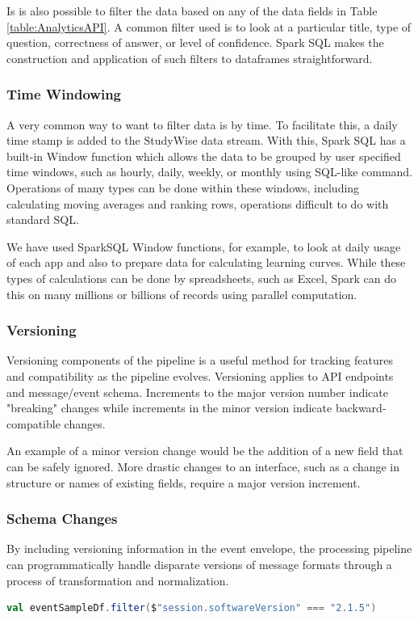 \documentclass[runningheads,a4paper]{llncs}
\begin{document}
Is is also possible to filter the data based on any of the data fields in Table \ref{table:AnalyticsAPI}.  A common filter used is to look at a particular title, type of question, correctness of answer, or level of confidence.  Spark SQL makes the construction and application of such filters to dataframes straightforward.
 
\subsubsection{Time Windowing}

A very common way to want to filter data is by time.  To facilitate this, a daily time stamp is added to the StudyWise data stream.  With this, Spark SQL has a built-in Window function which allows the data to be grouped by user specified time windows, such as hourly, daily, weekly, or monthly using SQL-like command.  Operations of many types can be done within these windows, including calculating moving averages and ranking rows, operations difficult to do with standard SQL.  

We have used SparkSQL Window functions, for example, to look at daily usage of each app and also to prepare data for calculating learning curves.  While these types of calculations can be done by spreadsheets, such as Excel, Spark can do this on many millions or billions of records using parallel computation.

\subsubsection{Versioning}
Versioning components of the pipeline is a useful method for tracking features and compatibility as the pipeline evolves. Versioning applies to API endpoints and message/event schema. Increments to the major version number indicate "breaking" changes while increments in the minor version indicate backward-compatible changes.

An example of a minor version change would be the addition of a new field that can be safely ignored. More drastic changes to an interface, such as a change in structure or names of existing fields, require a major version increment.

\subsubsection{Schema Changes}

By including versioning information in the event envelope, the processing pipeline can programmatically handle disparate versions of message formats through a process of transformation and normalization.
\begin{lstlisting}[language=Scala, basicstyle = \small, caption={Filtering events based on a specific software or message version.}]
  val eventSampleDf.filter($"session.softwareVersion" === "2.1.5")
\end{lstlisting}
\end{document}
